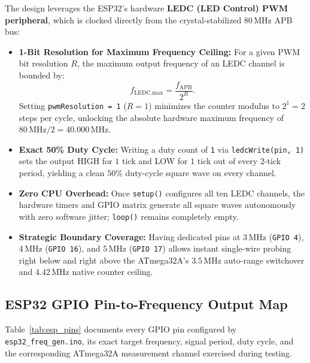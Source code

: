 \documentclass[11pt,a4paper]{article}
\begin{document}
The design leverages the ESP32's hardware \textbf{LEDC (LED Control) PWM peripheral}, which is clocked directly from the crystal-stabilized $80\,\text{MHz}$ APB bus:
\begin{itemize}[leftmargin=1.5em]
    \item \textbf{1-Bit Resolution for Maximum Frequency Ceiling:} For a given PWM bit resolution $R$, the maximum output frequency of an LEDC channel is bounded by:
    \begin{equation}
        f_{\text{LEDC,max}} = \frac{f_{\text{APB}}}{2^{R}}.
    \end{equation}
    Setting \texttt{pwmResolution = 1} ($R = 1$) minimizes the counter modulus to $2^{1} = 2$ steps per cycle, unlocking the absolute hardware maximum frequency of $80\,\text{MHz} / 2 = 40.000\,\text{MHz}$.
    \item \textbf{Exact 50\% Duty Cycle:} Writing a duty count of \texttt{1} via \texttt{ledcWrite(pin, 1)} sets the output HIGH for $1$ tick and LOW for $1$ tick out of every $2$-tick period, yielding a clean $50\%$ duty-cycle square wave on every channel.
    \item \textbf{Zero CPU Overhead:} Once \texttt{setup()} configures all ten LEDC channels, the hardware timers and GPIO matrix generate all square waves autonomously with zero software jitter; \texttt{loop()} remains completely empty.
    \item \textbf{Strategic Boundary Coverage:} Having dedicated pins at $3\,\text{MHz}$ (\texttt{GPIO 4}), $4\,\text{MHz}$ (\texttt{GPIO 16}), and $5\,\text{MHz}$ (\texttt{GPIO 17}) allows instant single-wire probing right below and right above the ATmega32A's $3.5\,\text{MHz}$ auto-range switchover and $4.42\,\text{MHz}$ native counter ceiling.
\end{itemize}

\subsection{ESP32 GPIO Pin-to-Frequency Output Map}
Table~\ref{tab:esp_pins} documents every GPIO pin configured by \texttt{esp32\_freq\_gen.ino}, its exact target frequency, signal period, duty cycle, and the corresponding ATmega32A measurement channel exercised during testing.
\end{document}
